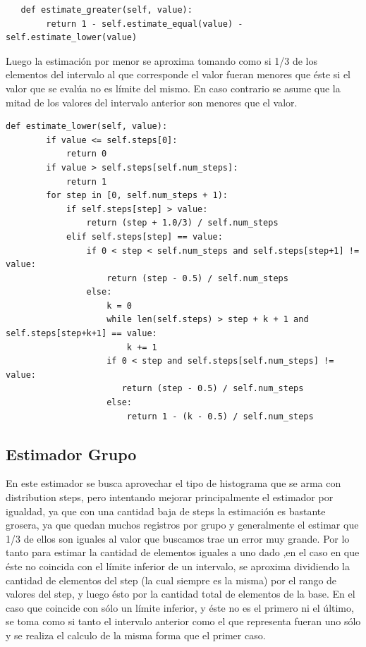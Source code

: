 \documentclass[a4paper, 10pt, twoside]{article}
\begin{document}
 \begin{verbatim}
   def estimate_greater(self, value):
        return 1 - self.estimate_equal(value) - self.estimate_lower(value)
 \end{verbatim}
 Luego la estimación por menor se aproxima tomando como si 1/3 de los
elementos del intervalo al que corresponde el valor fueran menores que éste si el valor que se evalúa no es límite del mismo. En caso contrario se asume que la mitad de los valores del intervalo anterior son menores que el valor.

\begin{verbatim}
def estimate_lower(self, value):
        if value <= self.steps[0]:
            return 0
        if value > self.steps[self.num_steps]:
            return 1
        for step in [0, self.num_steps + 1):
            if self.steps[step] > value:
                return (step + 1.0/3) / self.num_steps
            elif self.steps[step] == value:
                if 0 < step < self.num_steps and self.steps[step+1] != value:
                    return (step - 0.5) / self.num_steps
                else:
                    k = 0
                    while len(self.steps) > step + k + 1 and self.steps[step+k+1] == value:
                        k += 1
                    if 0 < step and self.steps[self.num_steps] != value:
                       return (step - 0.5) / self.num_steps
                    else:
                        return 1 - (k - 0.5) / self.num_steps
\end{verbatim}

\subsection{Estimador Grupo}

En este estimador se busca aprovechar el tipo de histograma que se arma con distribution steps,
pero intentando mejorar principalmente el estimador por igualdad, ya que con una cantidad baja de steps la estimación es bastante grosera, ya que quedan muchos registros por
grupo y generalmente el estimar que 1/3 de ellos son iguales al valor que buscamos trae un error muy grande.
Por lo tanto para estimar la cantidad de elementos iguales a uno dado ,en el caso en que éste no coincida con el límite inferior de un intervalo, se aproxima dividiendo la cantidad de elementos del step
(la cual siempre es la misma) por el rango de valores del step, y luego ésto por la cantidad total de elementos de la base.
En el caso que coincide con sólo un límite inferior, y éste no es el primero ni el último, se toma como si tanto el intervalo anterior como el que representa fueran uno sólo y se realiza el calculo de la misma forma que el primer caso.
\end{document}
